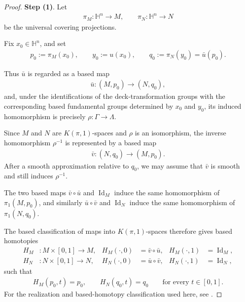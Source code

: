 \documentclass[11pt]{amsart}
\theoremstyle{plain}
\theoremstyle{plain}
\theoremstyle{plain}
\newcommand{\Id}{\operatorname{Id}}
\numberwithin{equation}{section}
\begin{document}
\begin{proof}
\textbf{Step (1)}. Let
\begin{align}
\pi_M:\mathbb H^n\longrightarrow M,
\qquad
\pi_N:\mathbb H^n\longrightarrow N
\nonumber
\end{align}
be the universal covering projections.  

Fix \(x_0\in\mathbb H^n\), and set
\begin{align}
p_0:=\pi_M(x_0),
\qquad
y_0:=u(x_0),
\qquad
q_0:=\pi_N(y_0)=\bar u(p_0).
\nonumber
\end{align}

Thus \(\bar u\) is regarded as a based map
\begin{align}
\bar u:(M,p_0)\longrightarrow(N,q_0),
\nonumber
\end{align}
and, under the identifications of the deck-transformation groups with
the corresponding based fundamental groups determined by \(x_0\) and
\(y_0\), its induced homomorphism is precisely
\(\rho:\Gamma\to\Lambda\).

Since \(M\) and \(N\) are \(K(\pi,1)\)-spaces and \(\rho\) is an
isomorphism, the inverse homomorphism \(\rho^{-1}\) is represented by a
based map
\begin{align}
\bar v:(N,q_0)\longrightarrow(M,p_0).
\nonumber
\end{align}
After a smooth approximation relative to \(q_0\), we may assume that
\(\bar v\) is smooth and still induces \(\rho^{-1}\).  

The two based maps \(\bar v\circ\bar u\) and \(\Id_M\) induce the same homomorphism
of \(\pi_1(M,p_0)\), and similarly \(\bar u\circ\bar v\) and
\(\Id_N\) induce the same homomorphism of \(\pi_1(N,q_0)\).

The based classification of maps into \(K(\pi,1)\)-spaces therefore gives based homotopies
\begin{align}
H_M&:M\times[0,1]\longrightarrow M,
&
H_M(\cdot,0)&=\bar v\circ\bar u,
&
H_M(\cdot,1)&=\Id_M,
\nonumber\\
H_N&:N\times[0,1]\longrightarrow N,
&
H_N(\cdot,0)&=\bar u\circ\bar v,
&
H_N(\cdot,1)&=\Id_N,
\nonumber
\end{align}
such that
\begin{align}
H_M(p_0,t)=p_0,
\qquad
H_N(q_0,t)=q_0
\qquad\text{for every }t\in[0,1].
\nonumber
\end{align}
For the realization and based-homotopy classification used here, see
\cite[Proposition~1B.9, pp.~90--91]{Hatcher}.


\end{proof}
\end{document}
